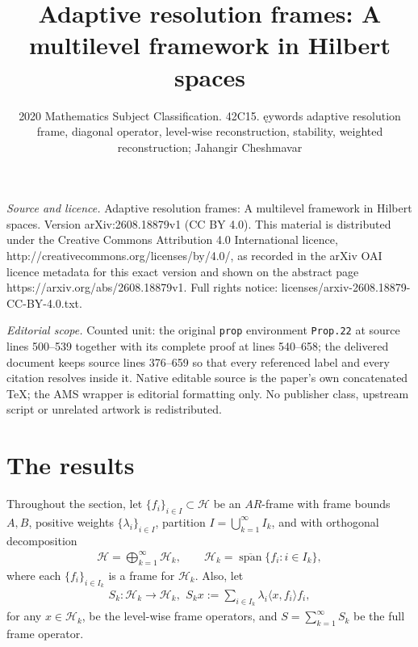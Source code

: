 \documentclass[10pt,a4paper]{amsart}
\begin{document}
\title[Adaptive resolution frames: A multilevel framework in Hilber]{Adaptive resolution frames: A multilevel framework in Hilbert spaces}
\author{2020 Mathematics Subject Classification. 42C15. ęywords adaptive resolution frame, diagonal operator, level-wise reconstruction, stability, weighted reconstruction; Jahangir Cheshmavar}
\date{}
\maketitle
\noindent\emph{Source and licence.} Adaptive resolution frames: A multilevel framework in Hilbert spaces. Version arXiv:2608.18879v1 (CC BY 4.0). This material is distributed under the Creative Commons Attribution 4.0 International licence, http://creativecommons.org/licenses/by/4.0/, as recorded in the arXiv OAI licence metadata for this exact version and shown on the abstract page https://arxiv.org/abs/2608.18879v1. Full rights notice: licenses/arxiv-2608.18879-CC-BY-4.0.txt.\par\smallskip
\noindent\textit{Editorial scope.} Counted unit: the original \texttt{prop} environment \texttt{Prop.22} at source lines 500--539 together with its complete proof at lines 540--658; the delivered document keeps source lines 376--659 so that every referenced label and every citation resolves inside it. Native editable source is the paper's own concatenated TeX; the AMS wrapper is editorial formatting only. No publisher class, upstream script or unrelated artwork is redistributed.
\section{\textbf{The results}}
Throughout the section, let $\{f_i\}_{i\in I}\subset\mathcal H$ be
an $AR$-frame with frame bounds $A, B$, positive weights
$\{\lambda_i\}_{i\in I}$, partition $I=\bigcup_{k=1}^\infty I_k$,
and with orthogonal decomposition
\begin{eqnarray*}
\mathcal H=\bigoplus_{k=1}^{\infty}\mathcal H_k, \qquad \mathcal
H_k=\overline{\operatorname{span}}\{f_i:i\in I_k\},
\end{eqnarray*}
where each $\{f_i\}_{i\in I_k}$ is a frame for $\mathcal H_k$.
Also, let
\begin{eqnarray*}
S_k:\mathcal H_k\rightarrow\mathcal H_k, \,\ S_kx:=\sum_{i\in
I_k}\lambda_i\langle x,f_i\rangle f_i,
\end{eqnarray*}
for any $x\in\mathcal H_k$, be the level-wise frame operators, and
$S=\sum_{k=1}^\infty S_k$ be the full frame operator.\\
\end{document}
